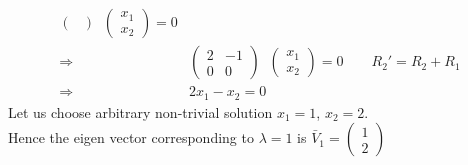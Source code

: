 \documentclass[../main-sheet.tex]{subfiles}
\begin{document}
\begin{soln}
\begin{align*}
\begin{pmatrix}
        \end{pmatrix}\;\;\begin{pmatrix}
            x_1\\
            x_2
        \end{pmatrix}=0\\
        \Rightarrow\;\;&\begin{pmatrix}
            2&-1\\
            0&0
        \end{pmatrix}\;\;\begin{pmatrix}
            x_1\\
            x_2
        \end{pmatrix}=0\qquad R_2'=R_2+R_1\\
        \Rightarrow\;\;&2x_1-x_2=0
    \end{align*}
    Let us choose arbitrary non-trivial solution \(x_1=1\), \(x_2=2\).\\
    Hence the eigen vector corresponding to \(\lambda=1\) is \(\displaystyle \bar{V}_1=\begin{pmatrix}
        1\\
        2
    \end{pmatrix}\)\\


\end{soln}
\end{document}
